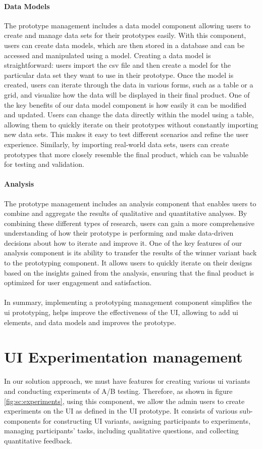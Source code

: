 \paragraph{Data Models}
The prototype management includes a data model component allowing users to create and manage data sets for their prototypes easily. 
With this component, users can create data models, which are then stored in a database and can be accessed and manipulated using a model.
Creating a data model is straightforward: users import the \ac{csv} file and then create a model for the particular data set they want to use in their prototype. 
Once the model is created, users can iterate through the data in various forms, such as a table or a grid, and visualize how the data will be displayed in their final product.
One of the key benefits of our data model component is how easily it can be modified and updated. 
Users can change the data directly within the model using a table, allowing them to quickly iterate on their prototypes without constantly importing new data sets. 
This makes it easy to test different scenarios and refine the user experience.
Similarly, by importing real-world data sets, users can create prototypes that more closely resemble the final product, which can be valuable for testing and validation.

\paragraph{Analysis}
The prototype management includes an analysis component that enables users to combine and aggregate the results of qualitative and quantitative analyses. 
By combining these different types of research, users can gain a more comprehensive understanding of how their prototype is performing and make data-driven decisions about how to iterate and improve it. 
One of the key features of our analysis component is its ability to transfer the results of the winner variant back to the prototyping component. 
It allows users to quickly iterate on their designs based on the insights gained from the analysis, ensuring that the final product is optimized for user engagement and satisfaction.\\\\
In summary, implementing a prototyping management component simplifies the \ac{ui} prototyping, helps improve the effectiveness of the UI, allowing to add \ac{ui} elements, and data models and improves the prototype.

\clearpage
\section{UI Experimentation management}
\label{sc:section:experimentation}
In our solution approach, we must have features for creating various \ac{ui} variants and conducting experiments of A/B testing. 
Therefore, as shown in figure \ref{fig:sc:experiments}, using this component, we allow the admin users to create experiments on the UI as defined in the UI prototype.
It consists of various sub-components for constructing UI variants, assigning participants to experiments, managing participants' tasks, including qualitative questions, and collecting quantitative feedback.

